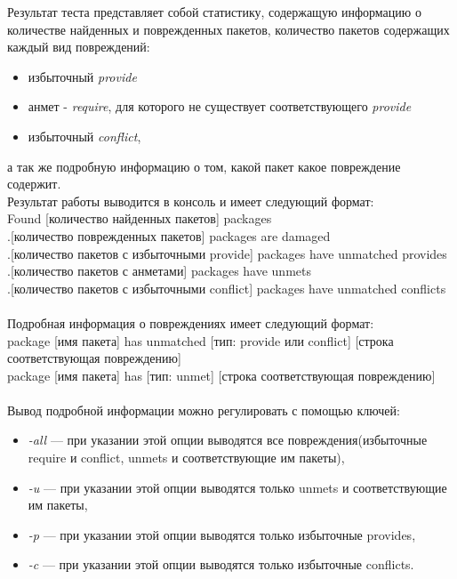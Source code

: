 Результат теста представляет собой статистику, содержащую информацию 
о количестве найденных и поврежденных пакетов, количество пакетов содержащих
каждый вид повреждений:\\
\begin{itemize}
\item{избыточный \textit{provide}}
\item{анмет - \textit{require}, для которого не существует соответствующего \textit{provide}}
\item{избыточный \textit{conflict}},
\end{itemize}
а так же подробную информацию о том, какой пакет какое повреждение содержит.\\
Результат работы выводится в консоль и имеет следующий формат:\\
 Found [количество найденных пакетов] packages\\
.[количество поврежденных пакетов] packages are damaged\\
.[количество пакетов с избыточными provide] packages have unmatched provides\\
.[количество пакетов с анметами] packages have unmets\\
.[количество пакетов с избыточными conflict] packages have unmatched conflicts\\
\\
Подробная информация о повреждениях имеет следующий формат:\\
package [имя пакета] has unmatched [тип: provide или conflict] [строка соответствующая повреждению]\\
package [имя пакета] has [тип: unmet] [строка соответствующая повреждению]\\
\\
Вывод подробной информации можно регулировать с помощью ключей:\\
\begin{itemize}
\item{\emph{-all} --- при указании этой опции выводятся все повреждения(избыточные require и conflict, unmets и
соответствующие им пакеты),}
\item{\emph{-u} --- при указании этой опции выводятся только unmets и соответствующие им пакеты,}
\item{\emph{-p} --- при указании этой опции выводятся только  избыточные provides,}
\item{\emph{-c} --- при указании этой опции выводятся только избыточные conflicts.}
\end{itemize}

